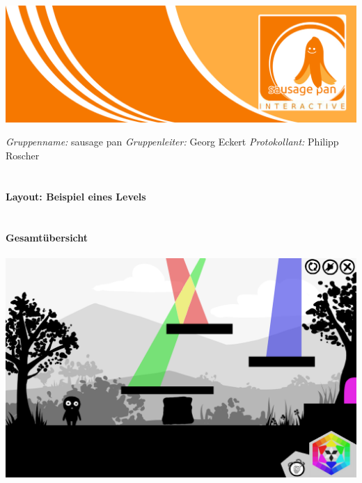 \documentclass[10pt,a4paper,notitlepage]{report}
\author{Sausage Pan}
\begin{document}
	\newcommand{\Eins}[1]{\color{orange}\textbf{{\Large#1}}} %
	\newcommand{\Zwei}[1]{\color{orange}\textbf{{\large#1}}} %
	\newcommand{\Drei}[1]{\color{orange}{\normalsize#1}} %
	\newcommand{\Text}{\color{schwarz}} %
	\newcommand{\Fusszeile}
	{\textit{{\footnotesize Eckert, Georg - Roscher, Philipp - Krien, Alexandra - Sinakow, Sergej - Blasberg, Bettina - Groß, Stephanie Sara}}} %
	\marginpar{\vspace{3.0mm} \color{orange}\rule{0.8mm}{53.3mm} \\[3mm] \color{hellorange}\rule{0.8mm}{170mm}}
	\begin{center}
		\includegraphics[width=160mm]{header2}
	\end{center}
	\color{orange} \textit{Gruppenname:} \color{schwarz}sausage pan \color{orange} \textit{Gruppenleiter:} \color{schwarz}Georg Eckert   \color{orange} \textit{Protokollant:} \color{schwarz}Philipp Roscher\\
	\\
	\\
	\Eins{Layout: Beispiel eines Levels}\\
	\\
	\\
	\Zwei{Gesamtübersicht}\\
	\\
	\includegraphics[width=1\textwidth]{png/screen.png}\
\end{document}
